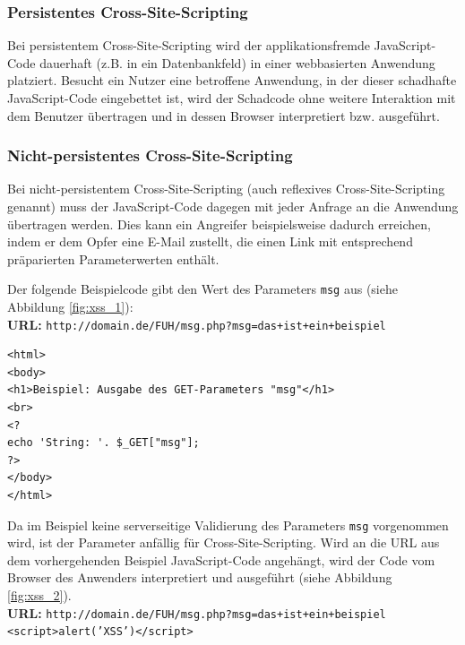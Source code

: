 \subsubsection{Persistentes Cross-Site-Scripting}

Bei persistentem Cross-Site-Scripting wird der applikationsfremde 
JavaScript-Code dauerhaft (z.B. in ein Datenbankfeld) in einer 
webbasierten Anwendung platziert. Besucht ein Nutzer eine betroffene 
Anwendung, in der dieser schadhafte JavaScript-Code eingebettet ist, 
wird der Schadcode ohne weitere Interaktion mit dem Benutzer übertragen 
und in dessen Browser interpretiert bzw. ausgeführt.

\subsubsection{Nicht-persistentes Cross-Site-Scripting}

Bei nicht-persistentem Cross-Site-Scripting (auch reflexives 
Cross-Site-Scripting genannt) muss der JavaScript-Code dagegen mit 
jeder Anfrage an die Anwendung übertragen werden. Dies kann ein 
Angreifer beispielsweise dadurch erreichen, indem er dem Opfer 
eine E-Mail zustellt, die einen Link mit entsprechend präparierten 
Parameterwerten enthält.

\newpage
{}

Der folgende Beispielcode gibt den Wert des Parameters \texttt{msg} 
aus (siehe Abbildung \ref{fig:xss_1}):
\\
\textbf{URL:} \texttt{http://domain.de/FUH/msg.php?msg=das+ist+ein+beispiel}

\begin{lstlisting}[basicstyle=\ttfamily\footnotesize]
<html>
<body>
<h1>Beispiel: Ausgabe des GET-Parameters "msg"</h1>
<br>
<?
echo 'String: '. $_GET["msg"];
?>
</body>
</html>
\end{lstlisting}

Da im Beispiel keine serverseitige Validierung des Parameters 
\texttt{msg} vorgenommen wird, ist der Parameter anfällig für 
Cross-Site-Scripting. Wird an die URL aus dem vorhergehenden 
Beispiel JavaScript-Code angehängt, wird der Code vom Browser 
des Anwenders interpretiert und ausgeführt (siehe Abbildung 
\ref{fig:xss_2}).
\\
\textbf{URL:} \texttt{http://domain.de/FUH/msg.php?msg=das+ist+ein+beispiel\\<script>alert('XSS')</script>}

